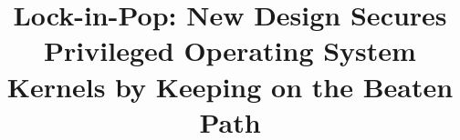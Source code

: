 \documentclass[letterpaper,twocolumn,10pt]{article}
\begin{document}




\title{\Large \bf{Lock-in-Pop: New Design Secures Privileged Operating System Kernels by Keeping on the Beaten Path}}




\maketitle


\thispagestyle{empty}



















{
\footnotesize


}



\end{document}
